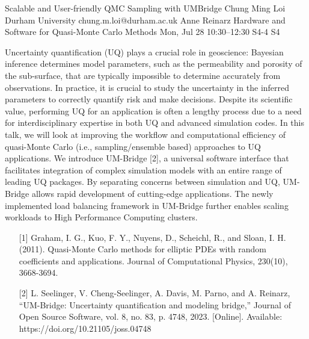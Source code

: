 \begin{talk}
  {Scalable and User-friendly QMC Sampling with UMBridge}%
  {Chung Ming Loi}%
  {Durham University}%
  {chung.m.loi@durham.ac.uk}%
  {Anne Reinarz}%
  {Hardware and Software for Quasi-Monte Carlo Methods}%
  {Mon, Jul 28 10:30–12:30}%
  {S4-4}%
  {S4}%
				
			
Uncertainty quantification (UQ) plays a crucial role in geoscience: Bayesian inference determines model parameters, such as the permeability and porosity of the sub-surface, that are typically impossible to determine accurately from observations. In practice, it is crucial to study the uncertainty in the inferred parameters to correctly quantify risk and make decisions. Despite its scientific value, performing UQ for an application is often a lengthy process due to a need for interdisciplinary expertise in both UQ and advanced simulation codes. In this talk, we will look at improving the workflow and computational efficiency of quasi-Monte Carlo (i.e., sampling/ensemble based) approaches to UQ applications. We introduce UM-Bridge [2], a universal software interface that facilitates integration of complex simulation models with an entire range of leading UQ packages. By separating concerns between simulation and UQ, UM-Bridge allows rapid development of cutting-edge applications. The newly implemented load balancing framework in UM-Bridge further enables scaling workloads to High Performance Computing clusters.

\begin{enumerate}
    \item[{[1]}] Graham, I. G., Kuo, F. Y., Nuyens, D., Scheichl, R., and Sloan, I. H. (2011). Quasi-Monte Carlo methods for elliptic PDEs with random coefficients and applications. Journal of Computational Physics, 230(10), 3668-3694.
    \item[{[2]}]  L. Seelinger, V. Cheng-Seelinger, A. Davis, M. Parno, and A. Reinarz, “UM-Bridge: Uncertainty quantification and modeling bridge,” Journal of Open Source Software, vol. 8, no. 83, p. 4748, 2023. [Online]. Available: https://doi.org/10.21105/joss.04748
\end{enumerate}

\end{talk}

